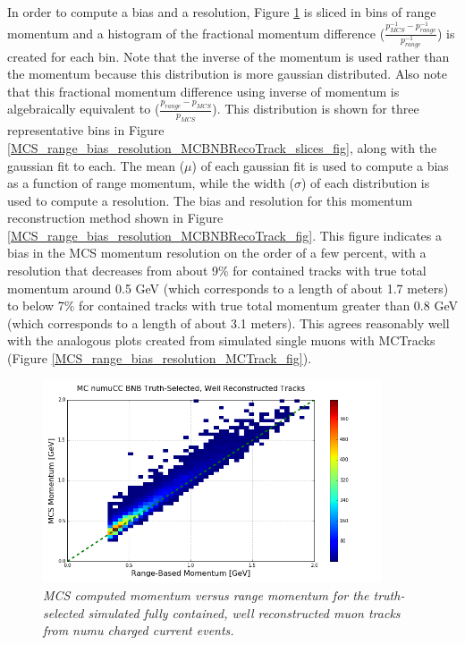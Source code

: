 In order to compute a bias and a resolution, Figure \ref{MCS_range_momentum_MCBNBRecoTrack_fig} is sliced in bins of range momentum and a histogram of the fractional momentum difference ($\frac{p_{MCS}^{-1} - p_{range}^{-1}}{p_{range}^{-1}}$) is created for each bin. Note that the inverse of the momentum is used rather than the momentum because this distribution is more gaussian distributed. Also note that this fractional momentum difference using inverse of momentum is algebraically equivalent to ($\frac{p_{range} - p_{MCS}}{p_{MCS}}$). This distribution is shown for three representative bins in Figure \ref{MCS_range_bias_resolution_MCBNBRecoTrack_slices_fig}, along with the gaussian fit to each.  The mean ($\mu$) of each gaussian fit is used to compute a bias as a function of range momentum, while the width ($\sigma$) of each distribution is used to compute a resolution. The bias and resolution for this momentum reconstruction method shown in Figure \ref{MCS_range_bias_resolution_MCBNBRecoTrack_fig}. This figure indicates a bias in the MCS momentum resolution on the order of a few percent, with a resolution that decreases from about 9\% for contained tracks with true total momentum around 0.5 GeV (which corresponds to a length of about 1.7 meters) to below 7\% for contained tracks with true total momentum greater than 0.8 GeV (which corresponds to a length of about 3.1 meters). This agrees reasonably well with the analogous plots created from simulated single muons with {\sc MCTracks} (Figure \ref{MCS_range_bias_resolution_MCTrack_fig}).


\begin{figure}[ht!]
\begin{center}
\includegraphics[width=100mm]{Figures/MCS_range_comparison_MCBNBRecoTrack.png}
\end{center}
\caption{\textit{MCS computed momentum versus range momentum for the truth-selected simulated fully contained, well reconstructed muon tracks from numu charged current events.}}
\label{MCS_range_momentum_MCBNBRecoTrack_fig}
\end{figure}


